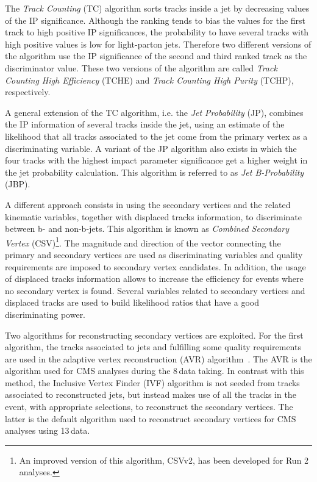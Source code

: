 The \emph{Track Counting} (TC) algorithm sorts tracks inside a jet by decreasing values of the IP significance. Although the ranking tends to bias the values for the first track to high positive IP significances, the probability to have several tracks with high positive values is low for light-parton jets. Therefore two different versions of the algorithm use the IP significance of the second and third ranked track as the discriminator value.  These two versions of the algorithm are called \emph{Track Counting High Efficiency} (TCHE) and \emph{Track Counting High Purity} (TCHP), respectively.

A general extension of the TC algorithm, i.e. the \emph{Jet Probability} (JP), combines the IP information of several tracks inside the jet, using an estimate of the likelihood that all tracks associated to the jet come from the primary vertex as a discriminating variable. A variant of
the JP algorithm also exists in which the four tracks with the highest impact parameter significance get a higher weight in the jet probability calculation. This algorithm is referred to as \emph{Jet B-Probability} (JBP).

A different approach consists in using the secondary vertices and the related kinematic variables, together with displaced tracks information, to discriminate between b- and non-b-jets. This algorithm is known as \emph{Combined Secondary Vertex} (CSV)\footnote{An improved version of this algorithm, CSVv2, has been developed for Run 2 analyses.}. The magnitude and direction of the vector connecting the primary and secondary vertices are used as discriminating variables and quality requirements are imposed to secondary vertex candidates. In addition, the usage of displaced tracks information allows to increase the efficiency for events where no secondary vertex is found. Several variables related to secondary vertices and displaced tracks are used to build likelihood ratios that have a good discriminating power.

Two algorithms for reconstructing secondary vertices are exploited. For the first algorithm, the
tracks associated to jets and fulfilling some quality requirements are used in the adaptive vertex reconstruction (AVR) algorithm~\cite{Waltenberger:1166320}. The AVR is the algorithm used for CMS analyses during the 8\,\TeV data taking. In contrast with this method, the Inclusive Vertex Finder (IVF) algorithm is not seeded from tracks associated to reconstructed jets, but instead makes use of all the tracks in the event, with appropriate selections, to reconstruct the secondary vertices. The latter is the default algorithm used to reconstruct secondary vertices for CMS analyses using 13\,\TeV data.

